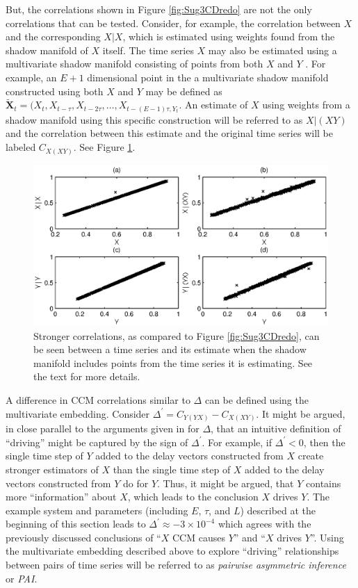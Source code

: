 \documentclass[twocolumn,aps,pre,groupedaddress]{revtex4-1}
\begin{document}
But, the correlations shown in Figure \ref{fig:Sug3CDredo} are not the only correlations that can be tested.  Consider, for example, the correlation between $X$ and the corresponding $X|X$, which is estimated using weights found from the shadow manifold of $X$ itself.  The time series $X$ may also be estimated using a multivariate shadow manifold consisting of points from both $X$ and $Y$ \cite{????}.  For example, an $E+1$ dimensional point in the a multivariate shadow manifold constructed using both $X$ and $Y$ may be defined as $\tilde{\mathbf{X}}_t=(X_t,X_{t-\tau},X_{t-2\tau},\ldots,X_{t-(E-1)\tau,Y_t}$.  An estimate of $X$ using weights from a shadow manifold using this specific construction will be referred to as $X|(XY)$ and the correlation between this estimate and the original time series will be labeled $C_{X(XY)}$.  See Figure \ref{fig:PAIintro}.
\begin{figure}[ht]
\includegraphics[scale=0.55]{SugFig3CD_AddPlot.eps}
\caption{Stronger correlations, as compared to Figure \ref{fig:Sug3CDredo}, can be seen between a time series and its estimate when the shadow manifold includes points from the time series it is estimating.  See the text for more details.}
\label{fig:PAIintro}
\end{figure}

A difference in CCM correlations similar to $\Delta$ can be defined using the multivariate embedding.  Consider $\Delta^\prime = C_{Y(YX)} - C_{X(XY)}$.  It might be argued, in close parallel to the arguments given in \cite{Sugihara2012} for $\Delta$, that an intuitive definition of ``driving'' might be captured by the sign of $\Delta^\prime$.  For example, if $\Delta^\prime<0$, then the single time step of $Y$ added to the delay vectors constructed from $X$ create stronger estimators of $X$ than the single time step of $X$ added to the delay vectors constructed from $Y$ do for $Y$.  Thus, it might be argued, that $Y$ contains more ``information'' about $X$, which leads to the conclusion $X$ drives $Y$.  The example system and parameters (including $E$, $\tau$, and $L$) described at the beginning of this section leads to $\Delta^\prime \approx -3\times 10^{-4}$ which agrees with the previously discussed conclusions of ``$X$ CCM causes $Y$'' and ``$X$ drives $Y$''.  Using the multivariate embedding described above to explore ``driving'' relationships between pairs of time series will be referred to as {\em pairwise asymmetric inference} or {\em PAI}.  
\end{document}
